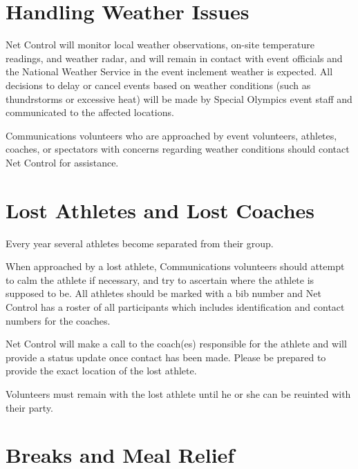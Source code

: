 \documentclass[pdflatex,letterpaper,twoside,12pt]{book}
\begin{document}

\section{Handling Weather Issues}

Net Control will monitor local weather observations, on-site temperature readings, and weather radar, and will remain in contact with event officials and the National Weather Service in the event inclement weather is expected.  All decisions to delay or cancel events based on weather conditions (such as thundrstorms or excessive heat) will be made by Special Olympics event staff and communicated to the affected locations.

Communications volunteers who are approached by event volunteers, athletes, coaches, or spectators with concerns regarding weather conditions should contact Net Control for assistance.


\section{Lost Athletes and Lost Coaches}

Every year several athletes become separated from their group.

When approached by a lost athlete, Communications volunteers should attempt to calm the athlete if necessary, and try to ascertain where the athlete is supposed to be.  All athletes should be marked with a bib number and Net Control has a roster of all participants which includes identification and contact numbers for the coaches.

Net Control will make a call to the coach(es) responsible for the athlete and will provide a status update once contact has been made.  Please be prepared to provide the exact location of the lost athlete.

Volunteers must remain with the lost athlete until he or she can be reuinted with their party.


\section{Breaks and Meal Relief}
\end{document}
